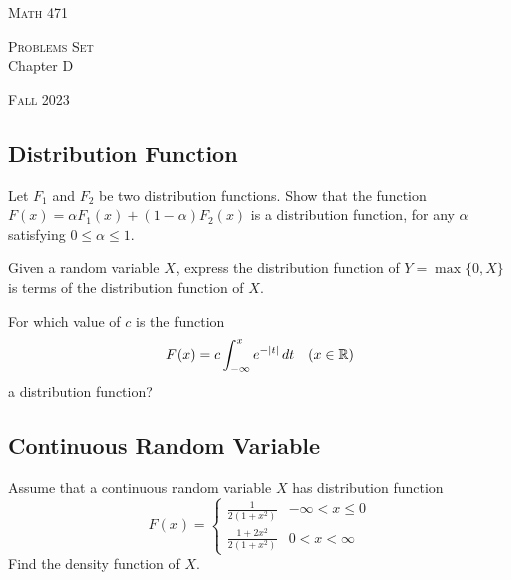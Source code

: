 


\hrulefill

\begin{minipage}{0.33\textwidth}
\textsc{Math 471}
\end{minipage} \hfill 
\begin{minipage}{0.32\textwidth}
\centering
\textsc{Problems Set} \\
Chapter D
\end{minipage}
 \hfill 
 \begin{minipage}{0.33\textwidth}
 \flushright \textsc{Fall 2023}
 \end{minipage}

\hrulefill

\setcounter{section}{4}

\subsection{Distribution Function}

\begin{problem}
Let $F_1$ and $F_2$ be two distribution functions. Show that the function $F(x) = \alpha F_1 (x) + (1 - \alpha ) F_2 (x)$ is a distribution function, for any $\alpha$ satisfying $0 \leq \alpha \leq 1$.
\end{problem}

\begin{problem}
Given a random variable $X$, express the distribution function of $Y = \max \{ 0, X \}$ is terms of the distribution function of $X$.
\end{problem}

\begin{problem}
For which value of $c$ is the function
    \[
        F(x) = c\int_{-\infty}^x e^{-|t|} \, dt \quad (x \in \mathbb{R} )
    \]
a distribution function?
\end{problem}

\subsection{Continuous Random Variable}

\begin{problem}
Assume that a continuous random variable $X$ has distribution function
    \[
        F(x) = \left\{ \begin{matrix} \displaystyle \frac{1}{2 (1 + x^2)} & -\infty < x \leq 0 \\
        \displaystyle \frac{1 + 2x^2}{2 (1 + x^2)} & 0 < x < \infty \end{matrix} \right.
    \]
Find the density function of $X$. 
\end{problem}

